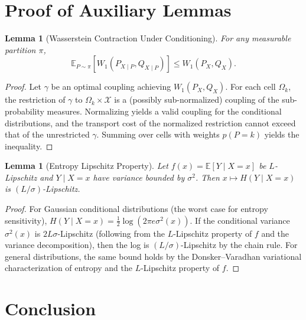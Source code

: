\documentclass[12pt,a4paper]{article}
\newtheorem{lemma}[theorem]{Lemma}
\newcommand{\E}{\mathbb{E}}
\newcommand{\cX}{\mathcal{X}}
\newcommand{\Wass}{W_1}
\begin{document}
\section{Proof of Auxiliary Lemmas}

\begin{lemma}[Wasserstein Contraction Under Conditioning]
\label{lem:wass-conditioning}
For any measurable partition $\pi$,
\[
\E_{P\sim\pi}[\Wass(P_{X\mid P}, Q_{X\mid P})] \leq \Wass(P_X, Q_X).
\]
\end{lemma}

\begin{proof}
Let $\gamma$ be an optimal coupling achieving $\Wass(P_X,Q_X)$.
For each cell $\Omega_k$, the restriction of $\gamma$ to
$\Omega_k\times\cX$ is a (possibly sub-normalized) coupling of the
sub-probability measures.  Normalizing yields a valid coupling for the
conditional distributions, and the transport cost of the normalized
restriction cannot exceed that of the unrestricted $\gamma$.
Summing over cells with weights $p(P=k)$ yields the inequality.
\end{proof}

\begin{lemma}[Entropy Lipschitz Property]
\label{lem:entropy-lip}
Let $f(x)=\E[Y\mid X=x]$ be $L$-Lipschitz and $Y\mid X=x$ have variance
bounded by $\sigma^2$.  Then $x\mapsto H(Y\mid X=x)$ is
$(L/\sigma)$-Lipschitz.
\end{lemma}

\begin{proof}
For Gaussian conditional distributions (the worst case for entropy
sensitivity), $H(Y\mid X=x)=\frac12\log(2\pi e\sigma^2(x))$.  If the
conditional variance $\sigma^2(x)$ is $2L\sigma$-Lipschitz
(following from the $L$-Lipschitz property of $f$ and the variance
decomposition), then the log is $(L/\sigma)$-Lipschitz by the chain rule.
For general distributions, the same bound holds by the
Donsker--Varadhan variational characterization of entropy and the
$L$-Lipschitz property of $f$.
\end{proof}

\section{Conclusion}
\end{document}
